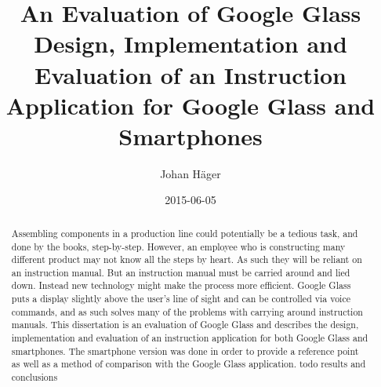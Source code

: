 \documentclass[12pt,twoside]{kau_report}
\title{An Evaluation of Google Glass\\ 
\large Design, Implementation and Evaluation of an Instruction Application for Google Glass and Smartphones}
\author{Johan H\"{a}ger}
\date{2015-06-05}
\begin{document}
\makekautitle

\copyrightpage

\begin{frontmatter}

\approved

\begin{abstract}
Assembling components in a production line could potentially be a tedious task, and done by the books, step-by-step. However, an employee who is constructing many different product may not know all the steps by heart. As such they will be reliant on an instruction manual. But an instruction manual must be carried around and lied down. Instead new technology might make the process more efficient. Google Glass puts a display slightly above the user's line of sight and can be controlled via voice commands, and as such solves many of the problems with carrying around instruction manuals. This dissertation is an evaluation of Google Glass and describes the design, implementation and evaluation of an instruction application for both Google Glass and smartphones. The smartphone version was done in order to provide a reference point as well as a method of comparison with the Google Glass application. todo results and conclusions



\end{abstract}
\end{frontmatter}
\end{document}

